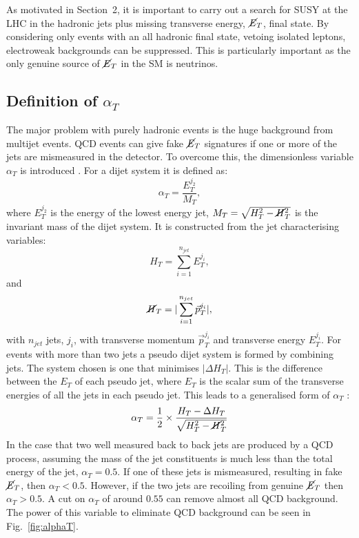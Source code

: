 
As motivated in Section~2, it is important to carry out a search for SUSY at the LHC in the hadronic jets plus missing transverse energy, $\cancel{E}_T$, final state. By considering only events with an all hadronic final state, vetoing isolated leptons, electroweak backgrounds can be suppressed. This is particularly important as the only genuine source of $\cancel{E}_T$ in the SM is neutrinos.
\subsection{Definition of \boldmath $\alpha_T$}
The major problem with purely hadronic events is the huge background from multijet events. QCD events can give fake $\cancel{E}_T$ signatures if one or more of the jets are mismeasured in the detector. To overcome this, the dimensionless variable $\alpha_T$ is introduced \cite{AlphaTproposalCMS:2008vya} \cite{AlphaTproposalPhysRevLett.101.221803}. For a dijet system it is defined as:
\begin{equation}
\alpha_T=\frac{E_T^{j_2}}{M_T},
\end{equation}
where $E_T^{j_2}$ is the energy of the lowest energy jet, $M_T=\sqrt{H_T^2-\cancel{H}_T^2}$ is the invariant mass of the dijet system. It is constructed from the jet characterising variables:
\begin{equation}
H_T=\sum_{i=1}^{n_{jet}}E_T^{j_i}, 
\end{equation}
and
\begin{equation}
\cancel{H}_T=|\sum_{i=1}^{n_{jet}}\vec{p}_T^{j_i}|,
\end{equation}
with $n_{jet}$ jets, $j_i$, with transverse momentum $\vec{p}_T^{j_i}$ and transverse energy $E_T^{j_i}$. For events with more than two jets a pseudo dijet system is formed by combining jets. The system chosen is one that minimises $|\Delta H_T|$. This is the difference between the $E_T$ of each pseudo jet, where $E_T$ is the scalar sum of the transverse energies of all the jets in each pseudo jet. This leads to a generalised form of $\alpha_T$ \cite{AlphaT8TeVChatrchyan:2013lya}:
\begin{equation}
\alpha_T=\frac{1}{2}\times\frac{H_T-\Delta H_T}{\sqrt{H_T^2-\cancel{H}_T^2}}
\end{equation}
In the case that two well measured back to back jets are produced by a QCD process, assuming the mass of the jet constituents is much less than the total energy of the jet, $\alpha_T=0.5$. If one of these jets is mismeasured, resulting in fake $\cancel{E}_T$, then $\alpha_T<0.5$. However, if the two jets are recoiling from genuine $\cancel{E}_T$ then $\alpha_T>0.5$. A cut on $\alpha_T$ of around $0.55$ can remove almost all QCD background. The power of this variable to eliminate QCD background can be seen in Fig.~\ref{fig:alphaT}.
